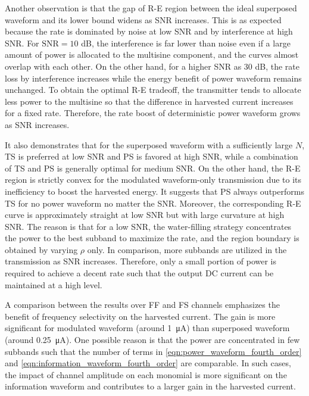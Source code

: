 Another observation is that the gap of R-E region between the ideal superposed waveform and its lower bound widens as SNR increases. This is as expected because the rate is dominated by noise at low SNR and by interference at high SNR. For ${\text{SNR}} = 10$ dB, the interference is far lower than noise even if a large amount of power is allocated to the multisine component, and the curves almost overlap with each other. On the other hand, for a higher SNR as 30 dB, the rate loss by interference increases while the energy benefit of power waveform remains unchanged. To obtain the optimal R-E tradeoff, the transmitter tends to allocate less power to the multisine so that the difference in harvested current increases for a fixed rate. Therefore, the rate boost of deterministic power waveform grows as SNR increases.

It also demonstrates that for the superposed waveform with a sufficiently large $N$, TS is preferred at low SNR and PS is favored at high SNR, while a combination of TS and PS is generally optimal for medium SNR. On the other hand, the R-E region is strictly convex for the modulated waveform-only transmission due to its inefficiency to boost the harvested energy. It suggests that PS always outperforms TS for no power waveform no matter the SNR. Moreover, the corresponding R-E curve is approximately straight at low SNR but with large curvature at high SNR. The reason is that for a low SNR, the water-filling strategy concentrates the power to the best subband to maximize the rate, and the region boundary is obtained by varying $\rho $ only. In comparison, more subbands are utilized in the transmission as SNR increases. Therefore, only a small portion of power is required to achieve a decent rate such that the output DC current can be maintained at a high level.

A comparison between the results over FF and FS channels emphasizes the benefit of frequency selectivity on the harvested current. The gain is more significant for modulated waveform (around \SI{1}{\uA}) than superposed waveform (around \SI{0.25}{\uA}). One possible reason is that the power are concentrated in few subbands such that the number of terms in \ref{eqn:power_waveform_fourth_order} and \ref{eqn:information_waveform_fourth_order} are comparable. In such cases, the impact of channel amplitude on each monomial is more significant on the information waveform and contributes to a larger gain in the harvested current.

